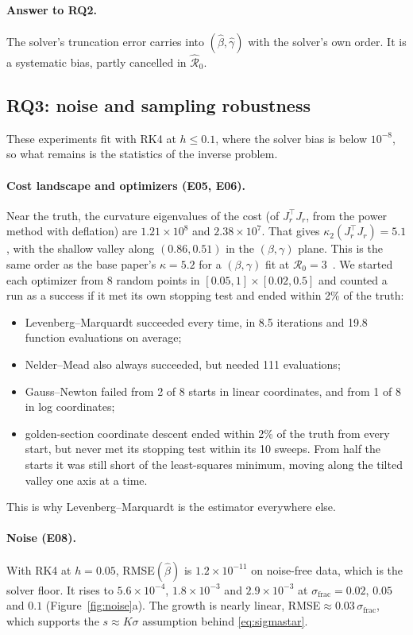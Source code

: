 \documentclass[sigconf]{acmart}
\begin{document}
\paragraph{Answer to RQ2.} The solver's truncation error carries into
$(\hat\beta,\hat\gamma)$ with the solver's own order. It is a
systematic bias, partly cancelled in $\hat{\mathcal R}_0$.

\subsection{RQ3: noise and sampling robustness}
\label{sec:res-rq3}
These experiments fit with RK4 at $h\le0.1$, where the solver bias is
below $10^{-8}$, so what remains is the statistics of the inverse
problem.

\paragraph{Cost landscape and optimizers (E05, E06).} Near the truth,
the curvature eigenvalues of the cost (of $J_r^\top J_r$, from the power
method with deflation) are $1.21\times10^8$ and $2.38\times10^7$. That
gives $\kappa_2(J_r^\top J_r)=5.1$, with the shallow valley along
$(0.86,0.51)$ in the $(\beta,\gamma)$ plane. This is the same order as
the base paper's $\kappa=5.2$ for a $(\beta,\gamma)$ fit at
$\mathcal R_0=3$~\cite{capaldi2012}. We started each optimizer from 8
random points in $[0.05,1]\times[0.02,0.5]$ and counted a run as a
success if it met its own stopping test and ended within 2\% of the
truth:
\begin{itemize}
  \item Levenberg--Marquardt succeeded every time, in 8.5 iterations and
    19.8 function evaluations on average;
  \item Nelder--Mead also always succeeded, but needed 111 evaluations;
  \item Gauss--Newton failed from 2 of 8 starts in linear coordinates,
    and from 1 of 8 in log coordinates;
  \item golden-section coordinate descent ended within 2\% of the truth
    from every start, but never met its stopping test within its 10
    sweeps. From half the starts it was still short of the
    least-squares minimum, moving along the tilted valley one axis at a
    time.
\end{itemize}
This is why Levenberg--Marquardt is the estimator everywhere else.

\paragraph{Noise (E08).} With RK4 at $h=0.05$, RMSE$(\hat\beta)$ is
$1.2\times10^{-11}$ on noise-free data, which is the solver floor. It
rises to $5.6\times10^{-4}$, $1.8\times10^{-3}$ and $2.9\times10^{-3}$
at $\sigma_{\mathrm{frac}}=0.02$, $0.05$ and $0.1$
(Figure~\ref{fig:noise}a). The growth is nearly linear,
RMSE$\approx0.03\,\sigma_{\mathrm{frac}}$, which supports the
$s\approx K\sigma$ assumption behind \eqref{eq:sigmastar}.
\end{document}
